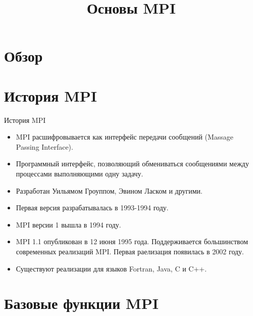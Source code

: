 

\title{Основы MPI}



\begin{frame}
\titlepage
\end{frame}

\section{Обзор}

\begin{frame}
\tableofcontents
\end{frame} 

\section{История MPI}

\begin{frame}{История MPI}

\begin{itemize}
	\item MPI расшифровывается как интерфейс передачи сообщений (\abbr Massage Passing Interface).
	\item Программный интерфейс, позволяющий обмениваться сообщениями между процессами выполняющими одну задачу.
	\item Разработан Уильямом Гроуппом, Эвином Ласком и другими.
	\item Первая версия разрабатывалась в 1993-1994 году.
	\item MPI версии 1 вышла в 1994 году.
	\item MPI 1.1 опубликован в 12 июня 1995 года. Поддерживается большинством современных реализаций MPI. Первая раелизация появилась в 2002 году.
	\item Существуют реализации для языков Fortran, Java, C и C++.
\end{itemize}

\end{frame}

\section{Базовые функции MPI}


